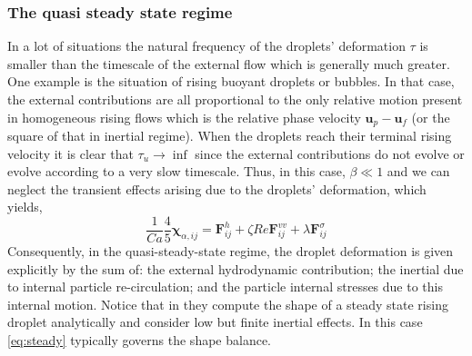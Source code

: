 \subsubsection{The quasi steady state regime}

In a lot of situations the natural frequency of the droplets' deformation $\tau$ is smaller than the timescale of the external flow which is generally much greater. 
One example is the situation of rising buoyant droplets or bubbles. 
In that case, the external contributions are all proportional to the only relative motion present in homogeneous rising flows which is the relative phase velocity $\textbf{u}_p-\textbf{u}_f$ (or the square of that in inertial regime).
When the droplets reach their terminal rising velocity it is clear that $\tau_u \to \inf$ since the external contributions do not evolve or evolve according to a very slow timescale. 
Thus, in this case, $\beta \ll 1$ and we can neglect the transient effects arising due to the droplets' deformation, which yields, 
\begin{equation}
    \frac{1}{Ca}
    \frac{4  }{5} \bm\chi_{\alpha,ij}
    = \textbf{F}_{ij}^h 
    + \zeta Re \textbf{F}_{ij}^{vv}
    + \lambda \textbf{F}_{ij}^{\sigma}
    \label{eq:steady}
\end{equation}
Consequently, in the quasi-steady-state regime, the droplet deformation is given explicitly by the sum of: the external hydrodynamic contribution; the inertial due to internal particle re-circulation; and the particle internal stresses due to this internal motion. 
Notice that in \citet{taylor1964deformation} they compute the shape of a steady state rising droplet analytically and consider low but finite inertial effects. 
In this case \ref{eq:steady} typically governs the shape balance.
 

